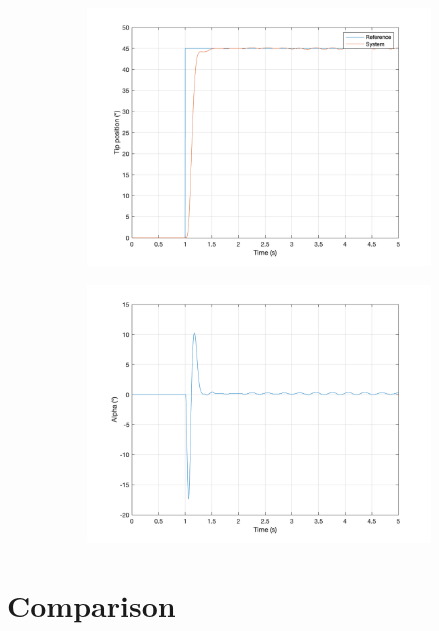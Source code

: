 \begin{figure}[H]
     \centering
     \begin{subfigure}{0.47\textwidth}
         \centering
         \includegraphics[width=\textwidth]{./images/Chapter 4/LQR/Step.png}
     \end{subfigure}
     \hfill
     \begin{subfigure}{0.47\textwidth}
         \centering
         \includegraphics[width=\textwidth]{./images/Chapter 4/LQR/Alpha.png}
     \end{subfigure}
\end{figure}


\section{Comparison}

